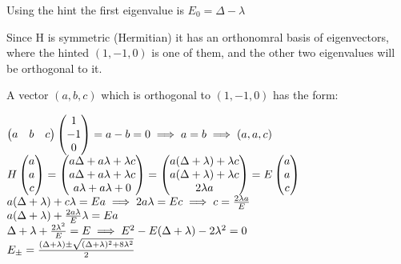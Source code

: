 \documentclass[14pt]{extarticle}
\makeatletter
\newenvironment{lefteqs}{%
    \begin{flushleft}%
    \renewcommand{\arraystretch}{1.3}%
    $\begin{array}{@{}l@{}}%
}{%
    \end{array}$%
    \end{flushleft}%
}
\makeatother
\begin{document}
Using the hint the first eigenvalue is $E_0 = \Delta - \lambda$

Since H is symmetric (Hermitian) it has an orthonomral basis of eigenvectors, where the hinted
$(1,-1,0)$ is one of them, and the other two eigenvalues will be orthogonal to it.

A vector $(a,b,c)$ which is orthogonal to $(1,-1,0)$ has the form:
\begin{lefteqs}
    \begin{pmatrix}
        a & b & c
    \end{pmatrix}
    \begin{pmatrix}
        1 \\
        -1 \\
        0
    \end{pmatrix}
    = a-b=0 \implies a=b \implies (a,a,c) \\
    H \begin{pmatrix}
        a \\
        a \\
        c
    \end{pmatrix}
    = \begin{pmatrix}
        a \Delta + a \lambda + \lambda c \\
        a \Delta + a \lambda + \lambda c \\
        a \lambda + a \lambda + 0
    \end{pmatrix}
    = \begin{pmatrix}
        a (\Delta + \lambda) + \lambda c \\
        a (\Delta + \lambda) + \lambda c \\
        2 \lambda a
    \end{pmatrix}
    = E \begin{pmatrix}
        a \\
        a \\
        c
    \end{pmatrix} \\
    a(\Delta + \lambda) + c \lambda = E a \implies 2a \lambda = Ec \implies c = \frac{2 \lambda a}{E} \\
    a(\Delta + \lambda) + \frac{2a \lambda}{E} \lambda = Ea \\
    \Delta + \lambda + \frac{2 \lambda^2}{E} = E 
    \implies E^2 - E(\Delta + \lambda) - 2 \lambda^2 = 0 \\
    E_{\pm} = \frac{(\Delta + \lambda) \pm \sqrt{(\Delta + \lambda)^2 + 8 \lambda^2}}{2}
\end{lefteqs}
\end{document}
